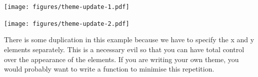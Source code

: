 \begin{Shaded}
\begin{Highlighting}[]
\StringTok{ }\NormalTok{(}
   \NormalTok{(} \NormalTok{),}
   \NormalTok{(} \NormalTok{),}
   \NormalTok{(} \NormalTok{),}
   \NormalTok{(} \NormalTok{, } \NormalTok{),}
   \NormalTok{(} \NormalTok{, } \NormalTok{),}
   \NormalTok{(} \NormalTok{, } \NormalTok{, }
    \NormalTok{)}
\NormalTok{)}
 \NormalTok{)}
\end{Highlighting}
\end{Shaded}

\texttt{[image: figures/theme-update-1.pdf]}

\begin{Shaded}
\begin{Highlighting}[]
 
\end{Highlighting}
\end{Shaded}

\texttt{[image: figures/theme-update-2.pdf]}

\begin{Shaded}
\begin{Highlighting}[]
\end{Highlighting}
\end{Shaded}

There is some duplication in this example because we have to specify the
x and y elements separately. This is a necessary evil so that you can
have total control over the appearance of the elements. If you are
writing your own theme, you would probably want to write a function to
minimise this repetition.

